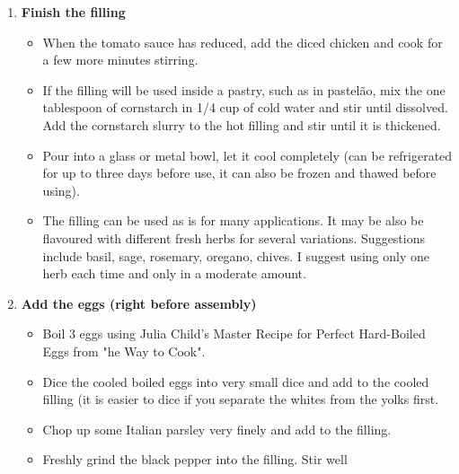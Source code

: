 \documentclass[11pt,letterpaper]{article}
\newcommand \fileName {ChickenFilling}
\begin{document}
\begin{description}
\begin{enumerate}
\begin{itemize}
        \item Pour broth into a small container and reserve.
        \item Dice the onion in very small dice.
        \item Add 2 Tablespoon of the reserved fat to the pan and heat up in moderately high heat.
        \item Add the diced onion and sautee for 5 minutes until the onion start wilting.
        \item Add 1 teaspoon of honey to the onion and continue salteeing until golden brown.
        \item Add the can of tomatoes and the reserved chicken broth.
        \item Let simmer until most of the water has evaporated and the fat is separating from the tomato sauce.
        \end{itemize}

        \item{\bf   Finish the filling}  
        \begin{itemize}
        \item When the tomato sauce has reduced, add the diced chicken and cook for a few more minutes stirring.
        \item If the filling will be used inside a pastry, such as in pastel\~ao, mix the one tablespoon of cornstarch in 1/4 cup of cold water and stir until dissolved. Add the cornstarch slurry to the hot filling and stir until it is thickened.
        \item Pour into a glass or metal bowl, let it cool completely (can be refrigerated for up to three days before use, it can also be frozen and thawed before using).
        \item The filling can be used as is for many applications. It may be also be flavoured with different fresh herbs for several variations. Suggestions include basil, sage, rosemary, oregano, chives. I suggest using only one herb each time and only in a moderate amount.
        \end{itemize}
        \item{\bf Add the eggs (right before assembly)}
	\begin{itemize}
	\item Boil 3 eggs using Julia Child's Master Recipe for Perfect Hard-Boiled Eggs from "he Way to Cook".
        \item Dice the cooled boiled eggs into very small dice and add to the cooled filling (it is easier to dice if you separate the whites from the yolks first.
        \item Chop up some Italian parsley very finely and add to the filling. 
        \item Freshly grind the black pepper into the filling. Stir well      
         \end{itemize}
	\end{enumerate}
\end{description}


\end{document}
